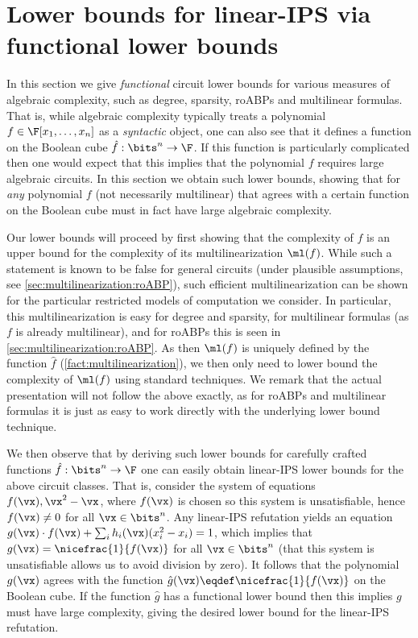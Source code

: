 \documentclass{toc}
\begin{document}
\section{Lower bounds for linear-IPS via functional lower bounds}\label{sec:lbs-fn}

In this section we give \emph{functional} circuit lower bounds for various measures of algebraic complexity, such as degree, sparsity, roABPs and multilinear formulas.  That is, while algebraic complexity typically treats a polynomial $f\in\F[x_1,\ldots,x_n]$ as a \emph{syntactic} object, one can also see that it defines a function on the Boolean cube $\hat{f}:\bits^n\to\F$.  If this function is particularly complicated then one would expect that this implies that the polynomial $f$ requires large algebraic circuits. In this section we obtain such lower bounds, showing that for \emph{any} polynomial $f$ (not necessarily multilinear) that agrees with a certain function on the Boolean cube must in fact have large algebraic complexity.

Our lower bounds will proceed by first showing that the complexity of $f$ is an upper bound for the complexity of its multilinearization $\ml(f)$.  While such a statement is known to be false for general circuits (under plausible assumptions, see \autoref{sec:multilinearization:roABP}), such efficient multilinearization can be shown for the particular restricted models of computation we consider.  In particular, this multilinearization is easy for degree and sparsity, for multilinear formulas (as $f$ is already multilinear), and for roABPs this is seen in \autoref{sec:multilinearization:roABP}.  As then $\ml(f)$ is uniquely defined by the function $\hat{f}$ (\autoref{fact:multilinearization}), we then only need to lower bound the complexity of $\ml(f)$ using standard techniques.  We remark that the actual presentation will not follow the above exactly, as for roABPs and multilinear formulas it is just as easy to work directly with the underlying lower bound technique.

We then observe that by deriving such lower bounds for carefully crafted functions $\hat{f}:\bits^n\to\F$ one can easily obtain linear-IPS lower bounds for the above circuit classes. That is, consider the system of equations $f(\vx),\vx^2-\vx$, where $f(\vx)$ is chosen so this system is unsatisfiable, hence $f(\vx)\ne0$ for all $\vx\in\bits^n$.  Any linear-IPS refutation yields an equation $g(\vx)\cdot f(\vx)+\sum_i h_i(\vx)(x_i^2-x_i)=1$, which implies that $g(\vx)=\nicefrac{1}{f(\vx)}$ for all $\vx\in\bits^n$ (that this system is unsatisfiable allows us to avoid division by zero). It follows that the polynomial $g(\vx)$ agrees with the function $\hat{g}(\vx)\eqdef \nicefrac{1}{f(\vx)}$ on the Boolean cube. If the function $\hat{g}$ has a functional lower bound then this implies $g$ must have large complexity, giving the desired lower bound for the linear-IPS refutation.
\end{document}
